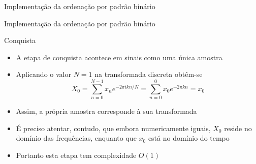 

\begin{frame}[fragile]{Implementação da ordenação por padrão binário}
\end{frame}

\begin{frame}[fragile]{Implementação da ordenação por padrão binário}
\end{frame}

\begin{frame}[fragile]{Conquista}

    \begin{itemize}
        \item A etapa de conquista acontece em sinais como uma única amostra

        \item Aplicando o valor $N = 1$ na transformada discreta obtêm-se
        \[
            X_0 = \sum_{n = 0}^{N - 1} x_ne^{-2\pi ikn/N} = 
                \sum_{n = 0}^0 x_0e^{-2\pi kn} = x_0
        \]

        \item Assim, a própria amostra corresponde à sua transformada

        \item É preciso atentar, contudo, que embora numericamente iguais, $X_0$ reside no 
            domínio das frequências, enquanto que $x_0$ está no domínio do tempo

        \item Portanto esta etapa tem complexidade $O(1)$

    \end{itemize}

\end{frame}

